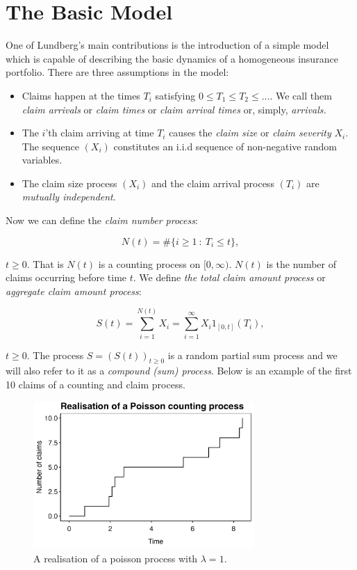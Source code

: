 \documentclass[a4paper,12pt,openany]{book}
\providecommand{\tightlist}{%
 \setlength{\itemsep}{0pt}\setlength{\parskip}{0pt}}
\begin{document}
\hypertarget{the-basic-model}{%
\section{The Basic Model}\label{the-basic-model}}

One of Lundberg's main contributions is the introduction of a simple model which is capable of describing the basic dynamics of a homogeneous insurance portfolio. There are three assumptions in the model:

\begin{itemize}
\tightlist
\item
  Claims happen at the times \(T_i\) satisfying \(0\le T_1 \le T_2 \le...\). We call them \emph{claim arrivals} or \emph{claim times} or \emph{claim arrival times} or, simply, \emph{arrivals.}
\item
  The \(i\)'th claim arriving at time \(T_i\) causes the \emph{claim size} or \emph{claim severity} \(X_i\). The sequence \((X_i)\) constitutes an i.i.d sequence of non-negative random variables.
\item
  The claim size process \((X_i)\) and the claim arrival process \((T_i)\) are \emph{mutually independent}.
\end{itemize}

Now we can define the \emph{claim number process}:

\[
N(t)=\#\{i\ge 1\ :\ T_i\le t\},
\]

\(t\ge 0\). That is \(N(t)\) is a counting process on \([0,\infty)\). \(N(t)\) is the number of claims occurring before time \(t\). We define \emph{the total claim amount process} or \emph{aggregate claim amount process}:

\[
S(t)=\sum_{i=1}^{N(t)}X_i=\sum_{i=1}^\infty X_i 1_{[0,t]}(T_i),
\]

\(t\ge 0\). The process \(S=(S(t))_{t\ge 0}\) is a random partial sum process and we will also refer to it as a \emph{compound (sum) process}. Below is an example of the first 10 claims of a counting and claim process.

\begin{figure}[H]
  \begin{center}
    \includegraphics[width=0.75\textwidth]{figures/skade1_plot1.png}
  \end{center}
  \caption{A realisation of a poisson process with $\lambda = 1$.}
\end{figure}
\end{document}
